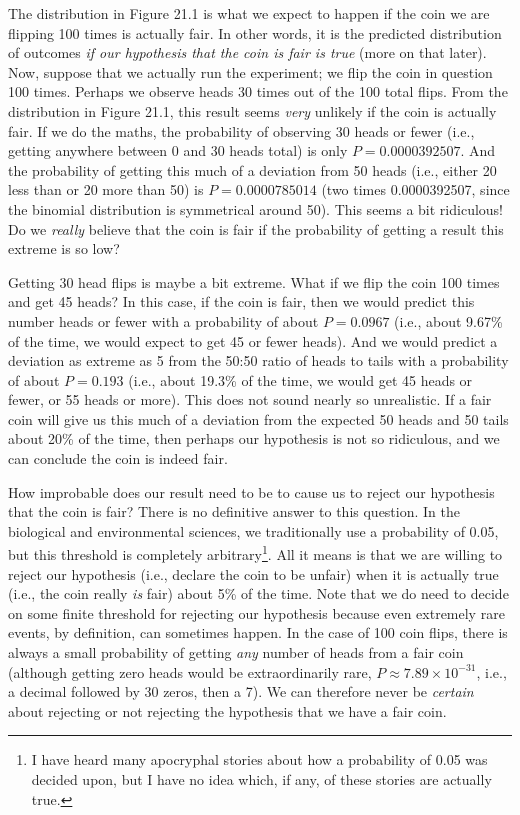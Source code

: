\documentclass[
  openany]{scrbook}
\begin{document}
The distribution in Figure 21.1 is what we expect to happen if the coin we are flipping 100 times is actually fair.
In other words, it is the predicted distribution of outcomes \emph{if our hypothesis that the coin is fair is true} (more on that later).
Now, suppose that we actually run the experiment; we flip the coin in question 100 times.
Perhaps we observe heads 30 times out of the 100 total flips.
From the distribution in Figure 21.1, this result seems \emph{very} unlikely if the coin is actually fair.
If we do the maths, the probability of observing 30 heads or fewer (i.e., getting anywhere between 0 and 30 heads total) is only \(P = 0.0000392507\).
And the probability of getting this much of a deviation from 50 heads (i.e., either 20 less than or 20 more than 50) is \(P = 0.0000785014\) (two times 0.0000392507, since the binomial distribution is symmetrical around 50).
This seems a bit ridiculous!
Do we \emph{really} believe that the coin is fair if the probability of getting a result this extreme is so low?

Getting 30 head flips is maybe a bit extreme.
What if we flip the coin 100 times and get 45 heads?
In this case, if the coin is fair, then we would predict this number heads or fewer with a probability of about \(P = 0.0967\) (i.e., about 9.67\% of the time, we would expect to get 45 or fewer heads).
And we would predict a deviation as extreme as 5 from the 50:50 ratio of heads to tails with a probability of about \(P = 0.193\) (i.e., about 19.3\% of the time, we would get 45 heads or fewer, or 55 heads or more).
This does not sound nearly so unrealistic.
If a fair coin will give us this much of a deviation from the expected 50 heads and 50 tails about 20\% of the time, then perhaps our hypothesis is not so ridiculous, and we can conclude the coin is indeed fair.

How improbable does our result need to be to cause us to reject our hypothesis that the coin is fair?
There is no definitive answer to this question.
In the biological and environmental sciences, we traditionally use a probability of 0.05, but this threshold is completely arbitrary\footnote{I have heard many apocryphal stories about how a probability of 0.05 was decided upon, but I have no idea which, if any, of these stories are actually true.}.
All it means is that we are willing to reject our hypothesis (i.e., declare the coin to be unfair) when it is actually true (i.e., the coin really \emph{is} fair) about 5\% of the time.
Note that we do need to decide on some finite threshold for rejecting our hypothesis because even extremely rare events, by definition, can sometimes happen.
In the case of 100 coin flips, there is always a small probability of getting \emph{any} number of heads from a fair coin (although getting zero heads would be extraordinarily rare, \(P \approx 7.89 \times 10^{-31}\), i.e., a decimal followed by 30 zeros, then a 7).
We can therefore never be \emph{certain} about rejecting or not rejecting the hypothesis that we have a fair coin.
\end{document}

